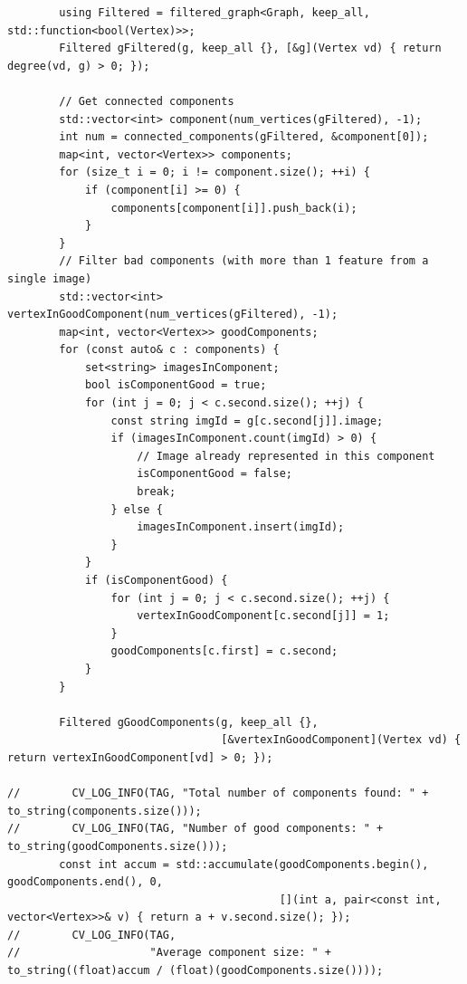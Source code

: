 \documentclass[a4paper, 12pt]{article}
\begin{document}
\begin{lstlisting}
        using Filtered = filtered_graph<Graph, keep_all, std::function<bool(Vertex)>>;
        Filtered gFiltered(g, keep_all {}, [&g](Vertex vd) { return degree(vd, g) > 0; });

        // Get connected components
        std::vector<int> component(num_vertices(gFiltered), -1);
        int num = connected_components(gFiltered, &component[0]);
        map<int, vector<Vertex>> components;
        for (size_t i = 0; i != component.size(); ++i) {
            if (component[i] >= 0) {
                components[component[i]].push_back(i);
            }
        }
        // Filter bad components (with more than 1 feature from a single image)
        std::vector<int> vertexInGoodComponent(num_vertices(gFiltered), -1);
        map<int, vector<Vertex>> goodComponents;
        for (const auto& c : components) {
            set<string> imagesInComponent;
            bool isComponentGood = true;
            for (int j = 0; j < c.second.size(); ++j) {
                const string imgId = g[c.second[j]].image;
                if (imagesInComponent.count(imgId) > 0) {
                    // Image already represented in this component
                    isComponentGood = false;
                    break;
                } else {
                    imagesInComponent.insert(imgId);
                }
            }
            if (isComponentGood) {
                for (int j = 0; j < c.second.size(); ++j) {
                    vertexInGoodComponent[c.second[j]] = 1;
                }
                goodComponents[c.first] = c.second;
            }
        }

        Filtered gGoodComponents(g, keep_all {},
                                 [&vertexInGoodComponent](Vertex vd) { return vertexInGoodComponent[vd] > 0; });

//        CV_LOG_INFO(TAG, "Total number of components found: " + to_string(components.size()));
//        CV_LOG_INFO(TAG, "Number of good components: " + to_string(goodComponents.size()));
        const int accum = std::accumulate(goodComponents.begin(), goodComponents.end(), 0,
                                          [](int a, pair<const int, vector<Vertex>>& v) { return a + v.second.size(); });
//        CV_LOG_INFO(TAG,
//                    "Average component size: " + to_string((float)accum / (float)(goodComponents.size())));


\end{lstlisting}
\end{document}

